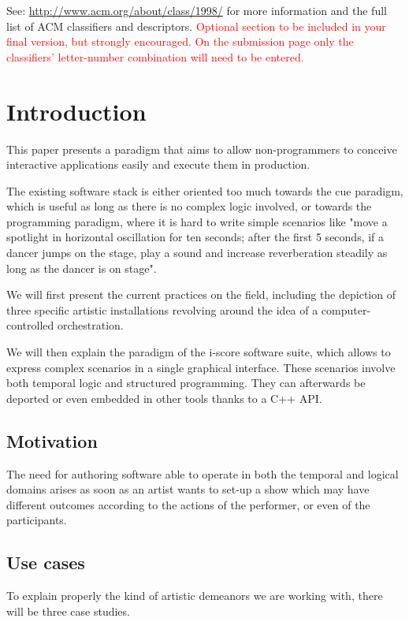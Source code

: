 \documentclass{sigchi}
\begin{document}

See: \url{http://www.acm.org/about/class/1998/}
for more information and the full list of ACM classifiers
and descriptors. \newline
\textcolor{red}{Optional section to be included in your final version, 
but strongly encouraged. On the submission page only the classifiers’ 
letter-number combination will need to be entered.}

\section{Introduction}
This paper presents a paradigm that aims to allow non-programmers 
to conceive interactive applications easily and execute them in production.

The existing software stack is either oriented too much towards the 
cue paradigm, which is useful as long as there is no complex logic involved, 
or towards the programming paradigm, where it is hard to write simple scenarios 
like "move a spotlight in horizontal oscillation for ten seconds; after the first 5 
seconds, if a dancer jumps on the stage, play a sound and increase reverberation steadily as long as the dancer is on stage".

We will first present the current practices on the field, including the depiction of three specific artistic installations revolving around the idea of a computer-controlled orchestration.

We will then explain the paradigm of the i-score software suite, which allows to express complex scenarios in a single graphical interface. These scenarios involve both temporal logic and structured programming. They can afterwards be deported or even embedded in other tools thanks to a C++ API. 

\subsection{Motivation}
The need for authoring software able to operate in both the temporal and logical domains arises as soon as an artist wants to set-up a show which may have different outcomes according to the actions of the performer, or even of the participants.

\subsection{Use cases}
To explain properly the kind of artistic demeanors we are working with, there will be three case studies.
\end{document}
